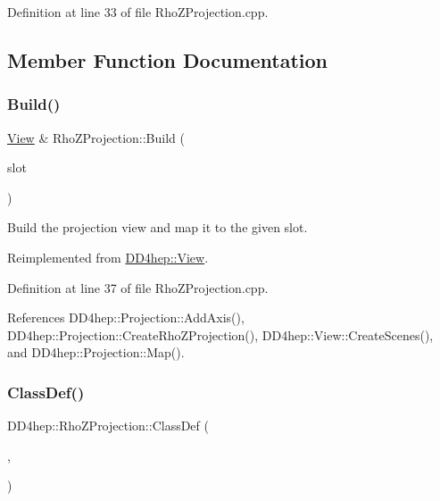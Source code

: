 Definition at line 33 of file Rho\+Z\+Projection.\+cpp.



\subsection{Member Function Documentation}
\hypertarget{class_d_d4hep_1_1_rho_z_projection_adc2e30a682bc645b5433d055774930ef}{}\label{class_d_d4hep_1_1_rho_z_projection_adc2e30a682bc645b5433d055774930ef} 
\subsubsection{\texorpdfstring{Build()}{Build()}}
{\footnotesize\ttfamily \hyperlink{class_d_d4hep_1_1_view}{View} \& Rho\+Z\+Projection\+::\+Build (\begin{DoxyParamCaption}\item[{T\+Eve\+Window $\ast$}]{slot }\end{DoxyParamCaption})\hspace{0.3cm}{\ttfamily [virtual]}}



Build the projection view and map it to the given slot. 



Reimplemented from \hyperlink{class_d_d4hep_1_1_view_ab4e12874a9cb6a599f268b027443c6ce}{D\+D4hep\+::\+View}.



Definition at line 37 of file Rho\+Z\+Projection.\+cpp.



References D\+D4hep\+::\+Projection\+::\+Add\+Axis(), D\+D4hep\+::\+Projection\+::\+Create\+Rho\+Z\+Projection(), D\+D4hep\+::\+View\+::\+Create\+Scenes(), and D\+D4hep\+::\+Projection\+::\+Map().

\hypertarget{class_d_d4hep_1_1_rho_z_projection_aef14a29e5037f6ac2df7eb09a8fa6c84}{}\label{class_d_d4hep_1_1_rho_z_projection_aef14a29e5037f6ac2df7eb09a8fa6c84} 
\subsubsection{\texorpdfstring{Class\+Def()}{ClassDef()}}
{\footnotesize\ttfamily D\+D4hep\+::\+Rho\+Z\+Projection\+::\+Class\+Def (\begin{DoxyParamCaption}\item[{\hyperlink{class_d_d4hep_1_1_rho_z_projection}{Rho\+Z\+Projection}}]{,  }\item[{0}]{ }\end{DoxyParamCaption})}



